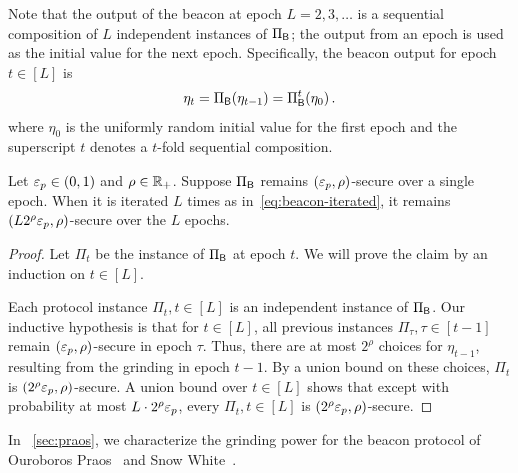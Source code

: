 Note that the output of the beacon at epoch $L = 2, 3, \ldots$  
is a sequential composition of $L$ independent instances of $\Pi_{\mathsf{B}}$; 
the output from an epoch is used as the initial value for the next epoch. 
Specifically, 
the beacon output for epoch $t \in [L]$ is 
\begin{align}\label{eq:beacon-iterated}
    \eta_t = \Pi_{\mathsf{B}}(\eta_{t-1}) = \Pi_{\mathsf{B}}^t(\eta_0)\,.
\end{align}
where $\eta_0$ is the uniformly random initial value for the first epoch 
and the superscript $t$ denotes a $t$-fold sequential composition.


\begin{lemma}\label{lemma:beacon-composition}
Let $\mathsf{\varepsilon}_p \in (0,1)$ and $\rho \in \mathbb{R}_+$.
Suppose $\Pi_{\mathsf{B}}$ remains $(\mathsf{\varepsilon}_p, \rho)$-secure over a single epoch. 
When it is iterated $L$ times as in~\eqref{eq:beacon-iterated}, 
it remains $\left(L 2^\rho \mathsf{\varepsilon}_p, \rho\right)$-secure 
over the $L$ epochs.
\end{lemma}
\begin{proof}
    Let $\Pi_t$ be the instance of $\Pi_{\mathsf{B}}$ at epoch $t$. 
    We will prove the claim by an induction on $t \in [L]$. 

    Each protocol instance $\Pi_t, t \in [L]$ 
    is an independent instance of $\Pi_{\mathsf{B}}$. 
    Our inductive hypothesis is that for $t \in [L]$, 
    all previous instances 
    $\Pi_\tau, \tau \in [t-1]$ remain $(\mathsf{\varepsilon}_p, \rho)$-secure in epoch $\tau$. 
    Thus, there are at most $2^\rho$ choices for $\eta_{t - 1}$, 
    resulting from the grinding in epoch $t-1$.
    By a union bound on these choices, $\Pi_t$ is $(2^\rho \mathsf{\varepsilon}_p, \rho)$-secure. 
    A union bound over $t \in [L]$ shows that 
    except with probability at most $L\cdot 2^\rho \mathsf{\varepsilon}_p$, 
    every $\Pi_t, t \in [L]$ is $(2^\rho \mathsf{\varepsilon}_p, \rho)$-secure.
\end{proof}


In \Section~\ref{sec:praos}, we characterize the grinding power 
for the beacon protocol of Ouroboros Praos~\cite{Praos} and Snow White~\cite{SnowWhite}.





